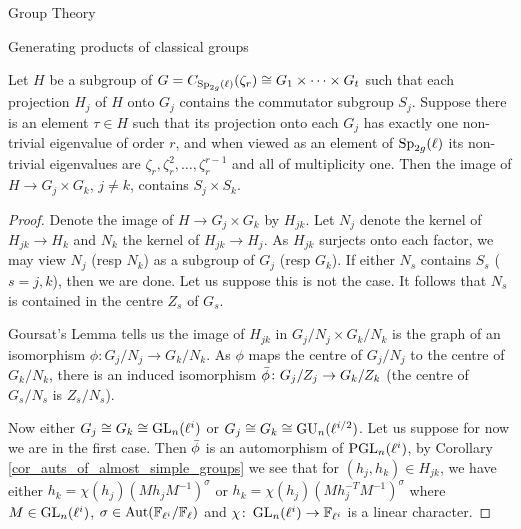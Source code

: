 \documentclass[11pt,a4paper]{article}
\newcommand{\Fl}{\mathbb{F}_\ell}
\newcommand{\Fli}{\mathbb{F}_{\ell^i}}
\newcommand{\zr}{\zeta_r}
\begin{document}
\begin{section}{Group Theory}
\begin{subsection}{Generating products of classical groups}
\begin{proposition}
\label{prop_two_factors}
Let $H$ be a subgroup of $G = C_{\Sp_{2g}(\ell)}(\zr) \cong G_1 \times \cdots \times G_t$ such that each projection $H_j$ of $H$ onto $G_j$ contains the commutator subgroup $S_j$.
Suppose there is an element $\tau \in H$ such that its projection onto each $G_j$ has exactly one non-trivial eigenvalue of order $r$, and when viewed as an element of $\Sp_{2g}(\ell)$ its non-trivial eigenvalues are $\zr, \zr^2, \ldots, \zr^{r-1}$ and all of multiplicity one.
Then the image of $H \rightarrow G_j\times G_k $, $j \neq k$, contains $S_j \times 
S_k$. 
\end{proposition}

\begin{proof}

Denote the image of $H \rightarrow G_j\times G_k $ by $H_{jk}$. 
Let $N_j$ denote the kernel of $ H_{jk} \rightarrow H_k$ and $N_k$ the kernel of $ H_{jk} \rightarrow H_j$.
As $H_{jk}$ surjects onto each factor, we may view $N_j$ (resp $N_k$) as a subgroup of $G_j$ (resp $G_k$).
If either $N_s$ contains $S_s$ ($s =j,k$), then we are done. Let us suppose this is not the case. It follows that $N_s$ is contained in the centre $Z_s$ of $G_s$.

Goursat's Lemma  tells us the image of $H_{jk}$ in $G_j/N_j \times G_k/N_k$ is the graph of an isomorphism $\phi\colon G_j/N_j \rightarrow G_k/N_k$. As $\phi$ maps the centre of $G_j/N_j$ to the centre of $G_k/N_k$, there is an induced isomorphism $\Bar{\phi}\colon G_j/Z_j \rightarrow G_k/Z_k$ (the centre of $G_s/N_s$ is $Z_s/N_s$).

Now either $G_j \cong G_k \cong \GL_n(\ell^i)$ or $G_j \cong G_k \cong  \GU_n(\ell^{i/2})$. Let us suppose for now we are in the first case.
Then $\Bar{\phi}$ is an automorphism of $\PGL_n(\ell^i)$, by Corollary \ref{cor_auts_of_almost_simple_groups} we see that for $(h_j,h_k) \in H_{jk}$, we have either $h_k = \chi(h_j)(Mh_jM^{-1})^{\sigma}$ or $h_k = \chi(h_j)(Mh_j^{-T}M^{-1})^{\sigma}$ where $M \in \GL_n(\ell^i)$, $\sigma \in \Aut(\Fli/\Fl)$ and $\chi\colon\GL_n(\ell^i) \rightarrow \Fli$ is a linear character.


\end{proof}
\end{subsection}
\end{section}
\end{document}
